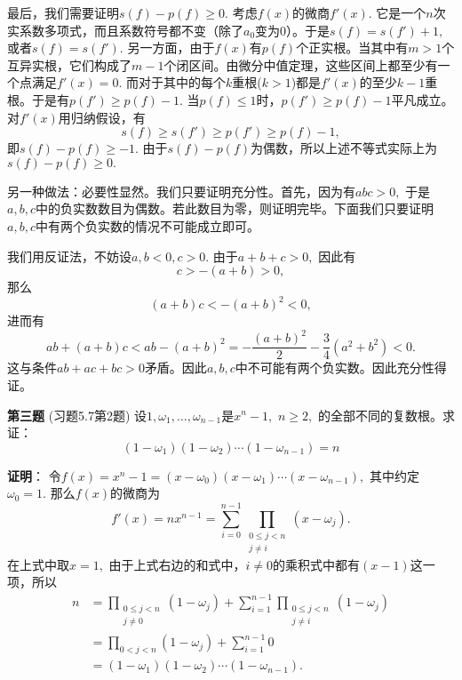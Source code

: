 最后，我们需要证明$s(f) - p(f) \geqslant 0.$ 考虑$f(x)$的微商$f'(x).$ 它是一个$n$次实系数多项式，而且系数符号都不变（除了$a_0$变为0）。于是$s(f) = s(f') + 1,$ 或者$s(f) = s(f').$ 另一方面，由于$f(x)$有$p(f)$个正实根。当其中有$m > 1$个互异实根，它们构成了$m - 1$个闭区间。由微分中值定理，这些区间上都至少有一个点满足$f'(x) = 0.$ 而对于其中的每个$k$重根($k > 1$)都是$f'(x)$的至少$k-1$重根。于是有$p(f') \geqslant p(f) - 1.$ 当$p(f) \leqslant 1$时，$p(f') \geqslant p(f) - 1$平凡成立。对$f'(x)$用归纳假设，有
$$s(f) \geqslant s(f') \geqslant p(f') \geqslant p(f) - 1,$$
即$s(f) - p(f) \geqslant -1.$ 由于$s(f) - p(f)$为偶数，所以上述不等式实际上为$s(f) - p(f) \geqslant 0.$

\vspace{1em}

另一种做法：必要性显然。我们只要证明充分性。首先，因为有$abc > 0,$ 于是$a, b, c$中的负实数数目为偶数。若此数目为零，则证明完毕。下面我们只要证明$a, b, c$中有两个负实数的情况不可能成立即可。

我们用反证法，不妨设$a, b < 0, c > 0.$ 由于$a + b + c > 0,$ 因此有
$$c > -(a + b) > 0,$$
那么
$$(a + b)c < -(a + b)^2 < 0,$$
进而有
$$ab + (a + b)c < ab - (a + b)^2 = -\dfrac{(a + b)^2}{2} - \dfrac{3}{4}(a^2 + b^2) < 0.$$
这与条件$ab + ac + bc > 0$矛盾。因此$a, b, c$中不可能有两个负实数。因此充分性得证。

\fi  %

\newpageorvspace

{\bf 第三题} (习题5.7第2题) 设$1, \omega_1, \ldots, \omega_{n-1}$是$x^n - 1,$ $n \geqslant 2,$ 的全部不同的复数根。求证：
$$(1 - \omega_1)(1 - \omega_2) \cdots (1 - \omega_{n-1}) = n$$

\ifIncludeAnswer

\newpageorvspace

{\bf 证明}： 令$f(x) = x^n - 1 = (x - \omega_0)(x - \omega_1) \cdots (x - \omega_{n-1}),$ 其中约定$\omega_0 = 1.$ 那么$f(x)$的微商为
$$f'(x) = nx^{n-1} = \sum\limits_{i=0}^{n-1} \prod\limits_{\substack{0 \leqslant j < n \\ j \neq i}} (x - \omega_j).$$
在上式中取$x = 1,$ 由于上式右边的和式中，$i \neq 0$的乘积式中都有$(x - 1)$这一项，所以
\begin{align*}
n & = \prod\limits_{\substack{0 \leqslant j < n \\ j \neq 0}} (1 - \omega_j) + \sum\limits_{i=1}^{n-1} \prod\limits_{\substack{0 \leqslant j < n \\ j \neq i}} (1 - \omega_j) \\
& = \prod\limits_{0 < j < n } (1 - \omega_j) + \sum\limits_{i=1}^{n-1} 0 \\
& = (1 - \omega_1)(1 - \omega_2) \cdots (1 - \omega_{n-1}).
\end{align*}

